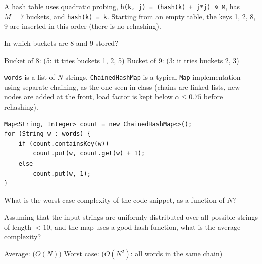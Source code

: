 \begin{question}
A hash table uses quadratic probing, \lstinline|h(k, j) = (hash(k) + j*j) % M|, has $M = 7$ buckets, and \mbox{\lstinline|hash(k) = k|}. Starting from an empty table, the keys 1, 2, 8, 9 are inserted in this order (there is no rehashing).

In which buckets are 8 and 9 stored?

Bucket of 8: \underline{\hspace{1in}} \ifanswers (5: it tries buckets 1, 2, 5)\fi
\qquad Bucket of 9: \underline{\hspace{1in}} \ifanswers (3: it tries buckets 2, 3)\fi
\end{question}

\begin{question}
\lstinline|words| is a list of $N$ strings. \lstinline|ChainedHashMap| is a typical \lstinline|Map| implementation using separate chaining, as the one seen in class (chains are linked lists, new nodes are added at the front, load factor is kept below $\alpha \le 0.75$ before rehashing).

\begin{lstlisting}
Map<String, Integer> count = new ChainedHashMap<>();
for (String w : words) {
    if (count.containsKey(w))
        count.put(w, count.get(w) + 1);
    else
        count.put(w, 1);
}
\end{lstlisting}

What is the worst-case complexity of the code snippet, as a function of $N$?

Assuming that the input strings are uniformly distributed over all possible strings of length $<10$, and the map uses a good hash function, what is the average complexity?

Average: \underline{\hspace{1in}} \ifanswers ($O(N)$)\fi
\qquad Worst case: \underline{\hspace{1in}} \ifanswers ($O(N^2)$: all words in the same chain)\fi
\end{question}

